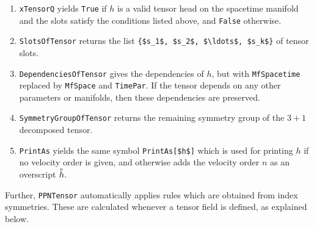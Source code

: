 \documentclass[notitlepage,a4paper,aps,prd,onecolumn,superscriptaddress,nofootinbib,groupedaddress,longbibliography]{revtex4-1}
\newcommand{\order}[2]{\accentset{#2}{#1}}
\begin{document}
\begin{enumerate}
\item
\lstinline/xTensorQ/ yields \lstinline/True/ if $h$ is a valid tensor head on the spacetime manifold and the slots satisfy the conditions listed above, and \lstinline/False/ otherwise.
\item
\lstinline/SlotsOfTensor/ returns the list \lstinline/{$s_1$, $s_2$, $\ldots$, $s_k$}/ of tensor slots.
\item
\lstinline/DependenciesOfTensor/ gives the dependencies of \(h\), but with \lstinline/MfSpacetime/ replaced by \lstinline/MfSpace/ and \lstinline/TimePar/. If the tensor depends on any other parameters or manifolds, then these dependencies are preserved.
\item
\lstinline/SymmetryGroupOfTensor/ returns the remaining symmetry group of the $3+1$ decomposed tensor.
\item
\lstinline/PrintAs/ yields the same symbol \lstinline/PrintAs[$h$]/ which is used for printing \(h\) if no velocity order is given, and otherwise adds the velocity order \(n\) as an overscript \(\order{h}{n}\).
\end{enumerate}
Further, \lstinline/PPNTensor/ automatically applies rules which are obtained from index symmetries. These are calculated whenever a tensor field is defined, as explained below.
\end{document}
